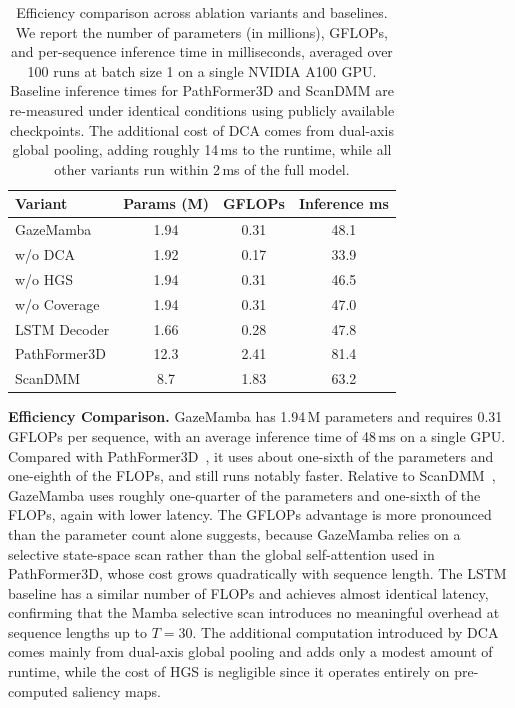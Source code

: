 \documentclass[sigconf]{acmart}
\begin{document}
\begin{table}[t]
  \centering
  \caption{Efficiency comparison across ablation variants and baselines.
    We report the number of parameters (in millions), GFLOPs, and per-sequence inference time in milliseconds, averaged over 100 runs at batch size 1 on a single NVIDIA A100 GPU.
    Baseline inference times for PathFormer3D and ScanDMM are re-measured under identical conditions using publicly available checkpoints.
    The additional cost of DCA comes from dual-axis global pooling, adding roughly 14\,ms to the runtime, while all other variants run within 2\,ms of the full model.}
  \label{tab:efficiency}
  \setlength{\tabcolsep}{5pt}
  \begin{tabular}{lccc}
    \toprule
    Variant              & Params (M) & GFLOPs & Inference ms \\
    \midrule
    GazeMamba            & 1.94       & 0.31   & 48.1 \\
    \quad w/o DCA        & 1.92       & 0.17   & 33.9 \\
    \quad w/o HGS        & 1.94       & 0.31   & 46.5 \\
    \quad w/o Coverage   & 1.94       & 0.31   & 47.0 \\
    \quad LSTM Decoder   & 1.66       & 0.28   & 47.8 \\
    \midrule
    PathFormer3D         & 12.3       & 2.41   & 81.4 \\
    ScanDMM              & 8.7        & 1.83   & 63.2 \\
    \bottomrule
  \end{tabular}
\end{table}

\textbf{Efficiency Comparison.}
GazeMamba has 1.94\,M parameters and requires 0.31\,GFLOPs per sequence, with an average inference time of 48\,ms on a single GPU.
Compared with PathFormer3D~\cite{quan2024pathformer3d}, it uses about one-sixth of the parameters and one-eighth of the FLOPs, and still runs notably faster.
Relative to ScanDMM~\cite{sui2023scandmm}, GazeMamba uses roughly one-quarter of the parameters and one-sixth of the FLOPs, again with lower latency.
The GFLOPs advantage is more pronounced than the parameter count alone suggests, because GazeMamba relies on a selective state-space scan rather than the global self-attention used in PathFormer3D, whose cost grows quadratically with sequence length.
The LSTM baseline has a similar number of FLOPs and achieves almost identical latency, confirming that the Mamba selective scan introduces no meaningful overhead at sequence lengths up to $T=30$.
The additional computation introduced by DCA comes mainly from dual-axis global pooling and adds only a modest amount of runtime, while the cost of HGS is negligible since it operates entirely on pre-computed saliency maps.
\end{document}
